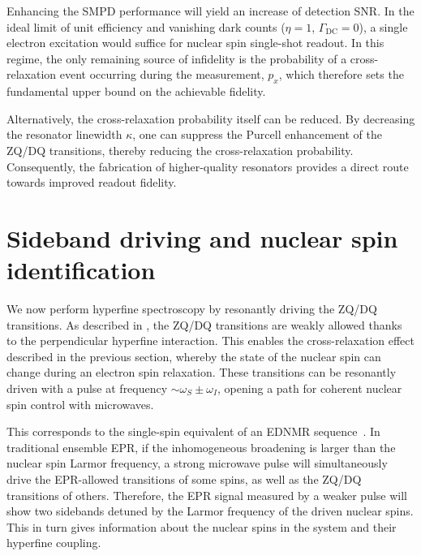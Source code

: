 Enhancing the SMPD performance will yield an increase of detection SNR. In the ideal limit of unit efficiency and vanishing dark counts ($\eta=1$, $\Gamma_\mathrm{DC}=0$), a single electron excitation would suffice for nuclear spin single-shot readout. In this regime, the only remaining source of infidelity is the probability of a cross-relaxation event occurring during the measurement, $p_x$, which therefore sets the fundamental upper bound on the achievable fidelity.

Alternatively, the cross-relaxation probability itself can be reduced. By decreasing the resonator linewidth $\kappa$, one can suppress the Purcell enhancement of the ZQ/DQ transitions, thereby reducing the cross-relaxation probability. Consequently, the fabrication of higher-quality resonators provides a direct route towards improved readout fidelity.


\section{Sideband driving and nuclear spin identification}

We now perform hyperfine spectroscopy by resonantly driving the ZQ/DQ transitions. As described in , the ZQ/DQ transitions are weakly allowed thanks to the perpendicular hyperfine interaction. This enables the cross-relaxation effect described in the previous section, whereby the state of the nuclear spin can change during an electron spin relaxation. These transitions can be resonantly driven with a pulse at frequency $\sim\omega_S\pm\omega_I$, opening a path for coherent nuclear spin control with microwaves.

This corresponds to the single-spin equivalent of an EDNMR sequence~. In traditional ensemble EPR, if the inhomogeneous broadening is larger than the nuclear spin Larmor frequency, a strong microwave pulse will simultaneously drive the EPR-allowed transitions of some spins, as well as the ZQ/DQ transitions of others. Therefore, the EPR signal measured by a weaker pulse will show two sidebands detuned by the Larmor frequency of the driven nuclear spins. This in turn gives information about the nuclear spins in the system and their hyperfine coupling.

